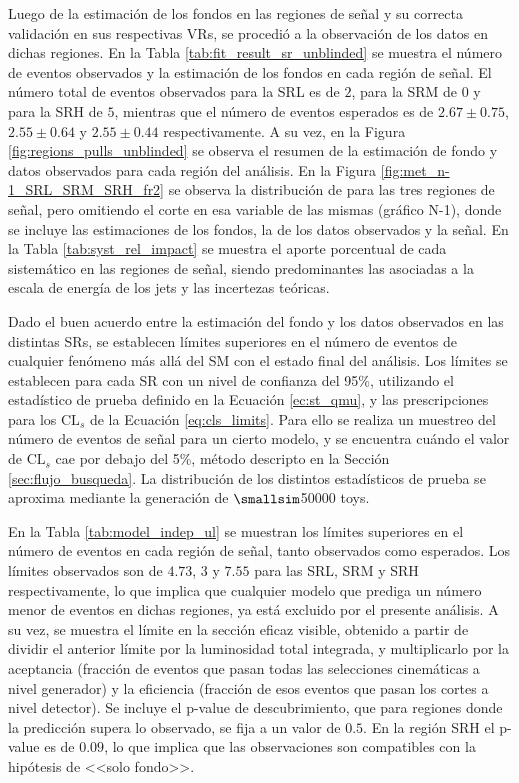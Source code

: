 Luego de la estimación de los fondos en las regiones de señal y su correcta validación en sus respectivas VRs, se procedió a la observación de los datos en dichas regiones. En la Tabla \ref{tab:fit_result_sr_unblinded} se muestra el número de eventos observados y la estimación de los fondos en cada región de señal. El número total de eventos observados para la SRL es de $2$, para la SRM de $0$ y para la SRH de $5$, mientras que el número de eventos esperados es de $2.67\pm0.75$, $2.55\pm0.64$ y $2.55\pm0.44$ respectivamente. A su vez, en la Figura \ref{fig:regions_pulls_unblinded} se observa el resumen de la estimación de fondo y datos observados para cada región del análisis. En la Figura \ref{fig:met_n-1_SRL_SRM_SRH_fr2} se observa la distribución de \met para las tres regiones de señal, pero omitiendo el corte en esa variable de las mismas (gráfico N-1), donde se incluye las estimaciones de los fondos, la de los datos observados y la señal. En la Tabla \ref{tab:syst_rel_impact} se muestra el aporte porcentual de cada sistemático en las regiones de señal, siendo predominantes las asociadas a la escala de energía de los jets y las incertezas teóricas.



Dado el buen acuerdo entre la estimación del fondo y los datos observados en las distintas SRs, se establecen límites superiores en el número de eventos de cualquier fenómeno más allá del SM con el estado final del análisis. Los límites se establecen para cada SR con un nivel de confianza del 95\%, utilizando el estadístico de prueba definido en la Ecuación \ref{ec:st_qmu}, y las prescripciones para los $\text{CL}_{s}$ de la Ecuación \ref{eq:cls_limits}. Para ello se realiza un muestreo del número de eventos de señal para un cierto modelo, y se encuentra cuándo el valor de $\text{CL}_{s}$ cae por debajo del 5\%, método descripto en la Sección \ref{sec:flujo_busqueda}. La distribución de los distintos estadísticos de prueba se aproxima mediante la generación de {$\smallsim$}50000 toys.

En la Tabla \ref{tab:model_indep_ul} se muestran los límites superiores en el número de eventos en cada región de señal, tanto observados como esperados. Los límites observados son de $4.73$, $3$ y $7.55$ para las SRL, SRM y SRH respectivamente, lo que implica que cualquier modelo que prediga un número menor de eventos en dichas regiones, ya está excluido por el presente análisis. A su vez, se muestra el límite en la sección eficaz visible, obtenido a partir de dividir el anterior límite por la luminosidad total integrada, y multiplicarlo por la aceptancia (fracción de eventos que pasan todas las selecciones cinemáticas a nivel generador) y la eficiencia (fracción de esos eventos que pasan los cortes a nivel detector). 
Se incluye el p-value de descubrimiento, que para regiones donde la predicción supera lo observado, se fija a un valor de $0.5$. En la región SRH el p-value es de $0.09$, lo que implica que las observaciones son compatibles con la hipótesis de <<solo fondo>>.


